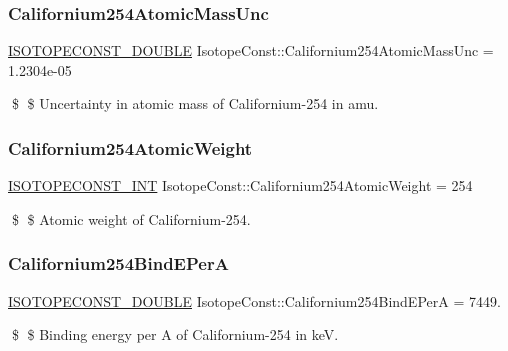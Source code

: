 \subsubsection{\texorpdfstring{Californium254\+Atomic\+Mass\+Unc}{Californium254AtomicMassUnc}}
{\footnotesize\ttfamily \mbox{\hyperlink{group___isotope_const-_macros_ga8f45a7272ce02c0b4c65c44636ed719a}{I\+S\+O\+T\+O\+P\+E\+C\+O\+N\+S\+T\+\_\+\+D\+O\+U\+B\+LE}} Isotope\+Const\+::\+Californium254\+Atomic\+Mass\+Unc = 1.\+2304e-\/05}

\$ \$ Uncertainty in atomic mass of Californium-\/254 in amu. \mbox{\label{group___isotope_const-_californium-_cf254_ga32bf7d3b9f1b613912fcafc1d3f68294}} 
\subsubsection{\texorpdfstring{Californium254\+Atomic\+Weight}{Californium254AtomicWeight}}
{\footnotesize\ttfamily \mbox{\hyperlink{group___isotope_const-_macros_ga5f18360b3e99483a35c32d789e62621c}{I\+S\+O\+T\+O\+P\+E\+C\+O\+N\+S\+T\+\_\+\+I\+NT}} Isotope\+Const\+::\+Californium254\+Atomic\+Weight = 254}

\$ \$ Atomic weight of Californium-\/254. \mbox{\label{group___isotope_const-_californium-_cf254_ga36cc921d04aab2a2c6ecd2c63a3da4c7}} 
\subsubsection{\texorpdfstring{Californium254\+Bind\+E\+PerA}{Californium254BindEPerA}}
{\footnotesize\ttfamily \mbox{\hyperlink{group___isotope_const-_macros_ga8f45a7272ce02c0b4c65c44636ed719a}{I\+S\+O\+T\+O\+P\+E\+C\+O\+N\+S\+T\+\_\+\+D\+O\+U\+B\+LE}} Isotope\+Const\+::\+Californium254\+Bind\+E\+PerA = 7449.}

\$ \$ Binding energy per A of Californium-\/254 in keV. \mbox{\label{group___isotope_const-_californium-_cf254_ga836ef0e75236fa99a1e422cf85b2e88a}} 

